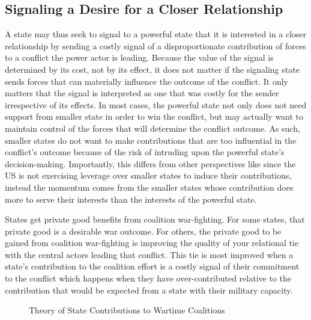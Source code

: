 \documentclass[12pt,letterpaper]{article}
\begin{document}
	\subsection{Signaling a Desire for a Closer Relationship}
		A state may thus seek to signal to a powerful state that it is interested in a closer relationship by sending a costly signal of a disproportionate contribution of forces to a conflict the power actor is leading. Because the value of the signal is determined by its cost, not by its effect, it does not matter if the signaling state sends forces that can materially influence the outcome of the conflict. It only matters that the signal is interpreted as one that was costly for the sender irrespective of its effects. In most cases, the powerful state not only does not need support from smaller state in order to win the conflict, but may actually want to maintain control of the forces that will determine the conflict outcome. As such, smaller states do not want to make contributions that are too influential in the conflict's outcome because of the risk of intruding upon the powerful state's decision-making. Importantly, this differs from other perspectives like \citet{bennett_burdensharingpersiangulf_1994} since the US is not exercising leverage over smaller states to induce their contributions, instead the momentum comes from the smaller states whose contribution does more to serve their interests than the interests of the powerful state.

		States get private good benefits from coalition war-fighting. For some states, that private good is a desirable war outcome.  For others, the private good to be gained from coalition war-fighting is improving the quality of your relational tie with the central actors leading that conflict. This tie is most improved when a state's contribution to the coalition effort is a costly signal of their commitment to the conflict which happens when they have over-contributed relative to the contribution that would be expected from a state with their military capacity.

		\begin{figure}[H]
		\centering
		\caption{Theory of State Contributions to Wartime Coalitions}
		\label{fig:theory}
		\end{figure}
\end{document}
